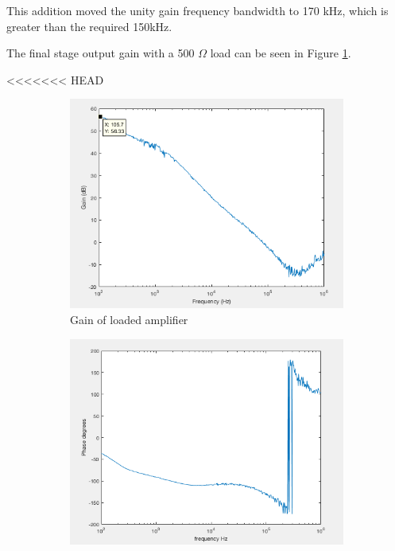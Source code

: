 	This addition moved the unity gain frequency bandwidth to 170 kHz, which is greater than the required 150kHz.
		
		
		
		
		
		
		
		
		
		
		
		
		
		
		
		
		
		 The final stage output gain with a 500 $\Omega$ load can be seen in Figure \ref{fig:gainwithload}.
				
		
<<<<<<< HEAD
		
		\begin{figure}[H]
			\centering
			\begin{subfigure}[b]{0.45\textwidth}
				\centering
				\includegraphics[scale=.40]{ExperimentalImplementation/gainwithload.png}
				\caption{Gain of loaded amplifier}
				\label{fig:gainwithload}
			\end{subfigure}
			\hfill
			\begin{subfigure}[b]{0.45\textwidth}
				\centering
				\includegraphics[scale=.40]{ExperimentalImplementation/phasewithload.png}

\end{subfigure}
\end{figure}
